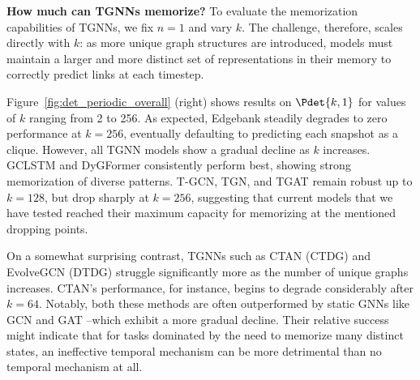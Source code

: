  \textbf{How much can TGNNs memorize?} To evaluate the memorization capabilities of TGNNs, we fix $n = 1$ and vary $k$. The challenge, therefore, scales directly with $k$: as more unique graph structures are introduced, models must maintain a larger and more distinct set of representations in their memory to correctly predict links at each timestep. \label{seq:memorize}

 Figure~\ref{fig:det_periodic_overall} (right) shows results on $\Pdet{k, 1}$ for values of $k$ ranging from 2 to 256. As expected, Edgebank steadily degrades to zero performance at $k = 256$, eventually defaulting to predicting each snapshot as a clique. However, all TGNN models show a gradual decline as $k$ increases. GCLSTM and DyGFormer consistently perform best, showing strong memorization of diverse patterns. T-GCN, TGN, and TGAT remain robust up to $k = 128$, but drop sharply at $k = 256$, suggesting that current models that we have tested reached their maximum capacity for memorizing at the mentioned dropping points.

 On a somewhat surprising contrast, TGNNs such as CTAN (CTDG) and  EvolveGCN (DTDG) struggle significantly more as the number of unique graphs increases. CTAN's performance, for instance, begins to degrade considerably after $k=64$.
Notably, both these methods are often outperformed by static GNNs like GCN and GAT --which exhibit a more gradual decline. Their relative success might indicate that for tasks dominated by the need to memorize many distinct states, an ineffective temporal mechanism can be more detrimental than no temporal mechanism at all.





